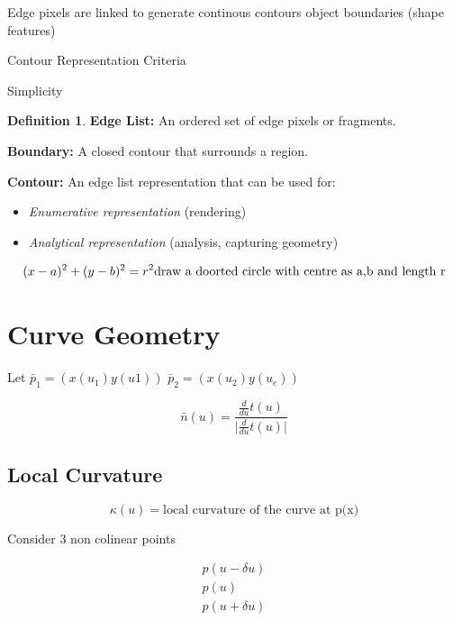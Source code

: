 \documentclass[11pt]{article}
\theoremstyle{definition}
\newtheorem{definition}{Definition}
\begin{document}
Edge pixels are linked to generate continous contours object boundaries (shape features)

Contour Representation Criteria 

Simplicity 

\begin{definition}
\textbf{Edge List:} An ordered set of edge pixels or fragments.

\textbf{Boundary:} A closed contour that surrounds a region.

\textbf{Contour:} An edge list representation that can be used for:
\begin{itemize}
    \item \textit{Enumerative representation} (rendering)
    \item \textit{Analytical representation} (analysis, capturing geometry)
\end{itemize}
\end{definition}


\begin{equation}
    (x-a)^2 + (y-b)^2 = r^2 \\ \text{draw a doorted circle with centre as a,b and length r}
\end{equation}


\newpage

\section{Curve Geometry}

\newpage

Let $\bar p_1 = (x(u_1) y(u1))$ $\bar p_2 = (x(u_2) y(u_e))$

\begin{equation}
    \bar n(u) = \frac{\frac{d}{du}t(u)}{\vert \frac{d}{du}t(u)\vert}
\end{equation}

\subsection{Local Curvature}

\begin{equation}
    \kappa(u) = \text{local curvature of the curve at p(x)}
\end{equation}

Consider 3 non colinear points

\begin{equation}
    \begin{aligned}
        p(u-\delta u)\\
        p(u)\\
        p(u+\delta u)
    \end{aligned}
\end{equation}
\end{document}
